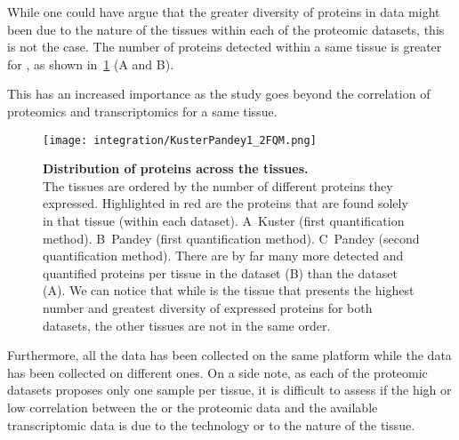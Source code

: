 While one could have argue that the greater diversity of proteins in
 data might been due to the nature of the tissues within
each of the proteomic datasets, this is not the case. The number of proteins
detected within a same tissue is greater for  ,
as shown in~\cref{fig:KusterPandeyFQM} (A and B).

This has an increased importance as the study goes beyond the correlation of
proteomics and transcriptomics for a same tissue.

\newcommand{\figKustPandFQM}{\textbf{Distribution of proteins across the
tissues.}\\The tissues are ordered by the number of different proteins they
expressed. Highlighted in red are the proteins that are found solely in that
tissue (within each dataset).
A\textbar\ Kuster (first quantification method).
B\textbar\ Pandey (first quantification method).
C\textbar\ Pandey (second quantification method).
There are by far many more detected and quantified proteins per tissue in the
\dataset{Pandey \etal} dataset (B\textbar) than the
\dataset{Kuster \etal} dataset (A\textbar). We can notice that while
\tissue{Testis} is the tissue that presents the highest number and greatest
diversity of expressed proteins for both datasets, the other tissues are not in
the same order.}


\begin{figure}[!htbp]
    \texttt{[image: integration/KusterPandey1\_2FQM.png]}\centering
    \caption[Distribution of proteins across the
    tissues]{\label{fig:KusterPandeyFQM}\figKustPandFQM}
\end{figure}

Furthermore, all the  data has been
collected on the same platform while the  data has been
collected on different ones. On a side note, as each of the proteomic datasets
proposes only one sample per tissue, it is difficult to assess if the high or low
correlation between the  or the 
proteomic data and the available transcriptomic data is due to the technology or
to the nature of the tissue.

